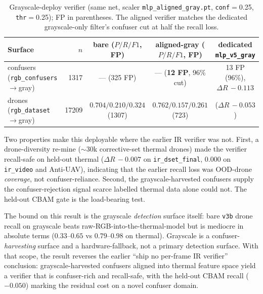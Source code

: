 \begin{table}[htbp]
    \centering
    \caption{Grayscale-deploy verifier (same net, scaler \texttt{mlp\_aligned\_gray.pt}, \texttt{conf}$=$0.25, \texttt{thr}$=$0.25); FP in parentheses. The aligned verifier matches the dedicated grayscale-only filter's confuser cut at half the recall loss.}
    \label{tab:ir_aligned_gray}
    \begin{tabular}{lrccc}
        \toprule
        Surface & $n$ & bare ($P/R/F1$, FP) & aligned-gray ($P/R/F1$, FP) & dedicated \texttt{mlp\_v5\_gray} \\
        \midrule
        confusers (\texttt{rgb\_confusers}$\to$gray) & 1317  & --- (325 FP) & --- (\textbf{12 FP}, 96\% cut) & 13 FP (96\%), $\Delta R\,{-}0.113$ \\
        drones (\texttt{rgb\_dataset}$\to$gray)      & 17209 & $0.704/0.210/0.324$ (1307) & $0.762/0.157/0.261$ (723) & ($\Delta R\,{-}0.053$) \\
        \bottomrule
    \end{tabular}
\end{table}

Two properties make this deployable where the earlier IR verifier was not. First, a drone-diversity re-mine ($\sim$30k corrective-set thermal drones) made the verifier recall-safe on held-out thermal ($\Delta R\,{-}0.007$ on \texttt{ir\_dset\_final}, $0.000$ on \texttt{ir\_video} and Anti-UAV), indicating that the earlier recall loss was OOD-drone \emph{coverage}, not confuser-reliance. Second, the grayscale-harvested confusers supply the confuser-rejection signal scarce labelled thermal data alone could not. The held-out CBAM gate is the load-bearing test.

The bound on this result is the grayscale \emph{detection} surface itself: bare \texttt{v3b} drone recall on grayscale beats raw-RGB-into-the-thermal-model but is mediocre in absolute terms ($0.33$--$0.65$ vs $0.79$--$0.98$ on thermal). Grayscale is a confuser-\emph{harvesting} surface and a hardware-fallback, not a primary detection surface. With that scope, the result reverses the earlier ``ship no per-frame IR verifier'' conclusion: grayscale-harvested confusers aligned into thermal feature space yield a verifier that is confuser-rich and recall-safe, with the held-out CBAM recall ($-0.050$) marking the residual cost on a novel confuser domain.

